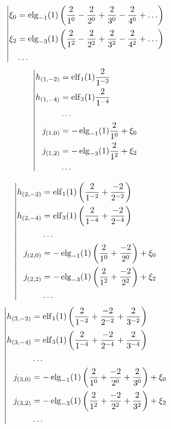 \begin{equation*} \left| \begin{aligned}
\xi_0 &= \elg_{-1}(1) \left(
  \frac{2}{1^0}
- \frac{2}{2^0}
+ \frac{2}{3^0}
- \frac{2}{4^0}
+ \ldots \right) \\
%
\xi_2 &= \elg_{-3}(1) \left(
  \frac{2}{1^2}
- \frac{2}{2^2}
+ \frac{2}{3^2}
- \frac{2}{4^2}
+ \ldots \right) \\
%
&\ldots \\
\end{aligned} \right. \end{equation*}
%
\begin{equation*} \left| \begin{aligned}
%
h_{(1,-2)} &=
  \elf_1(1) \frac{2}{1^{-2}} \\
%
h_{(1,-4)} &=
  \elf_3(1) \frac{2}{1^{-4}} \\
%
&\ldots \\
%
j_{(1,0)} &=
- \elg_{-1}(1) \frac{2}{1^0}
+ \xi_0 \\
%
j_{(1,2)} &=
- \elg_{-3}(1) \frac{2}{1^2}
+ \xi_2 \\
%
&\ldots \\
\end{aligned} \right. \end{equation*}

\begin{equation*} \left| \begin{aligned}
h_{(2,-2)} &=
  \elf_1(1) \left(
  \frac{2}{1^{-2}}
+ \frac{-2}{2^{-2}} \right) \\
%
h_{(2,-4)} &=
  \elf_3(1) \left(
  \frac{2}{1^{-4}}
+ \frac{-2}{2^{-4}} \right) \\
%
&\ldots \\
%
j_{(2,0)} &=
- \elg_{-1}(1) \left(
  \frac{2}{1^0}
+ \frac{-2}{2^0} \right)
+ \xi_0 \\
%
j_{(2,2)} &=
- \elg_{-3}(1) \left(
  \frac{2}{1^2}
+ \frac{-2}{2^2} \right)
+ \xi_2 \\
%
&\ldots \\
\end{aligned} \right. \end{equation*}
%
\begin{equation*} \left| \begin{aligned}
%
h_{(3,-2)} &=
  \elf_1(1) \left(
  \frac{2}{1^{-2}}
+ \frac{-2}{2^{-2}}
+ \frac{2}{3^{-2}} \right) \\
%
h_{(3,-4)} &=
  \elf_3(1) \left(
  \frac{2}{1^{-4}}
+ \frac{-2}{2^{-4}}
+ \frac{2}{3^{-4}} \right) \\
%
&\ldots \\
%
j_{(3,0)} &=
- \elg_{-1}(1) \left(
  \frac{2}{1^0}
+ \frac{-2}{2^0}
+ \frac{2}{3^0} \right)
+ \xi_0 \\
%
j_{(3,2)} &=
- \elg_{-3}(1) \left(
  \frac{2}{1^2}
+ \frac{-2}{2^2}
+ \frac{2}{3^2} \right)
+ \xi_2 \\
%
&\ldots \\
\end{aligned} \right. \end{equation*}